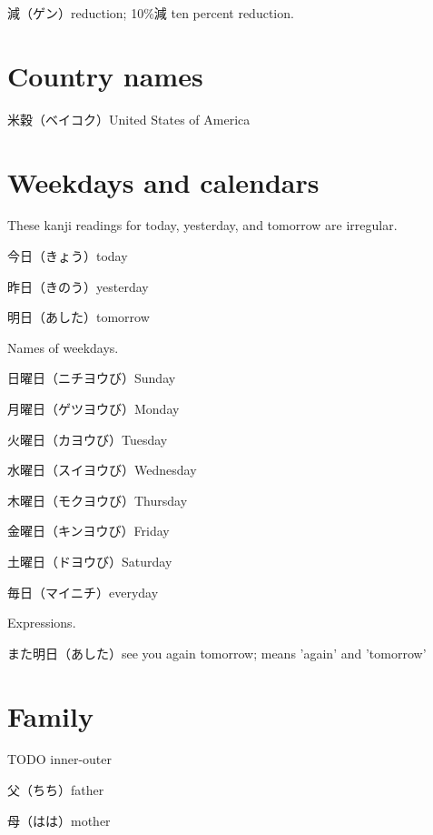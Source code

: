 減（ゲン）reduction; 10\%減 ten percent reduction.

\section{Country names}

米穀（ベイコク）United States of America

\section{Weekdays and calendars}

These kanji readings for today, yesterday, and tomorrow are irregular.

今日（きょう）today

昨日（きのう）yesterday

明日（あした）tomorrow

Names of weekdays.

日曜日（ニチヨウび）Sunday

月曜日（ゲツヨウび）Monday

火曜日（カヨウび）Tuesday

水曜日（スイヨウび）Wednesday

木曜日（モクヨウび）Thursday

金曜日（キンヨウび）Friday

土曜日（ドヨウび）Saturday

毎日（マイニチ）everyday

Expressions.

また明日（あした）see you again tomorrow; means 'again' and 'tomorrow'

\section{Family}

TODO inner-outer

父（ちち）father

母（はは）mother
